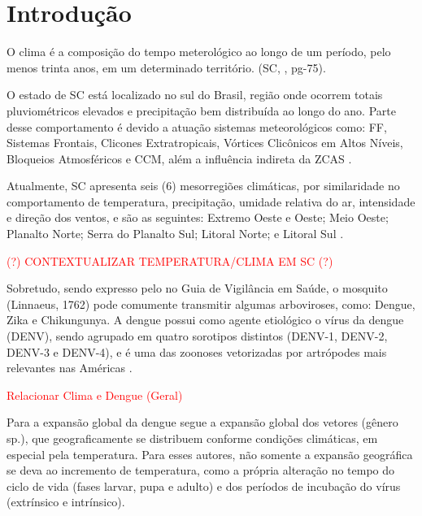 \chapter{Introdução}

\indent O clima é a composição do tempo meterológico ao longo de um período, pelo menos trinta anos, em um determinado território. (\acrlong{SC}, \citeyear{AtlasSCnatureza}, pg-75).

\indent O estado de \acrfull{SC} está localizado no sul do Brasil, região onde ocorrem totais pluviométricos elevados e precipitação bem distribuída ao longo do ano. Parte desse comportamento é devido a atuação sistemas meteorológicos como: \acrfull{FF}, Sistemas Frontais, Clicones Extratropicais, Vórtices Clicônicos em Altos Níveis, Bloqueios Atmosféricos e \acrfull{CCM}, além a influência indireta da \acrfull{ZCAS} \cite{reboita2010}.

\indent Atualmente, \acrlong{SC} apresenta seis (6) mesorregiões climáticas, por similaridade no comportamento de temperatura, precipitação, umidade relativa do ar, intensidade e direção dos ventos, e são as seguintes: Extremo Oeste e Oeste; Meio Oeste; Planalto Norte; Serra do Planalto Sul; Litoral Norte; e Litoral Sul \cite{Guerra2023Regionalizacao}.

\textcolor{red}{(?) CONTEXTUALIZAR TEMPERATURA/CLIMA EM SC (?)}

\indent Sobretudo, sendo expresso pelo  no Guia de Vigilância em Saúde, o mosquito  (Linnaeus, 1762) pode comumente transmitir algumas arboviroses, como: Dengue, Zika e Chikungunya. A dengue possui como agente etiológico o vírus da dengue (\acrfull{DENV}), sendo agrupado em quatro sorotipos distintos (\acrshort{DENV}-1, \acrshort{DENV}-2, \acrshort{DENV}-3 e \acrshort{DENV}-4), e é uma das zoonoses vetorizadas por artrópodes mais relevantes nas Américas \cite{GuiaVigSaúde22}.

\textcolor{red}{Relacionar Clima e Dengue (Geral)}

\indent Para  a expansão global da dengue segue a expansão global dos vetores (gênero  sp.), que geograficamente se distribuem conforme condições climáticas, em especial pela temperatura. Para esses autores, não somente a expansão geográfica se deva ao incremento de temperatura, como a própria alteração no tempo do ciclo de vida (fases larvar, pupa e adulto) e dos períodos de incubação do vírus (extrínsico e intrínsico).


